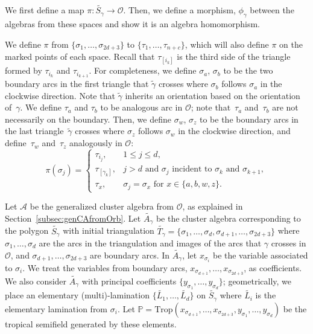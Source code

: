 \documentclass[pdftex]{sigma}%
\newcommand{\Orb}{\mathcal{O}}
\numberwithin{equation}{section}
\begin{document}
We first define a map $\pi\colon \widetilde{S_\gamma} \to \mathcal{O}$. Then, we define a morphism, $\phi_\gamma$ between the algebras from these spaces and show it is an algebra homomorphism.

We define $\pi$ from $\{\sigma_1,\ldots, \sigma_{2d +3}\}$ to $\{\tau_1,\ldots, \tau_{n+c}\}$, which will also define $\pi$ on the marked points of each space. Recall that $\tau_{[i_k]}$ is the third side of the triangle formed by $\tau_{i_k}$ and $\tau_{i_{k+1}}$. For completeness, we define $\sigma_a$, $\sigma_b$ to be the two boundary arcs in the first triangle that $\widetilde{\gamma}$ crosses where $\sigma_b$ follows $\sigma_a$ in the clockwise direction. Note that $\widetilde{\gamma}$ inherits an orientation based on the orientation of~$\gamma$. We define $\tau_a$ and $\tau_b$ to be analogous arc in $\mathcal{O}$; note that~$\tau_a$ and~$\tau_b$ are not necessarily on the boundary. Then, we define $\sigma_w$, $\sigma_z$ to be the boundary arcs in the last triangle~$\widetilde{\gamma}$ crosses where $\sigma_z$ follows $\sigma_w$ in the clockwise direction, and define~$\tau_w$ and~$\tau_z$ analogously in $\mathcal{O}$:
\[
\pi(\sigma_j) = \begin{cases} \tau_{i_j}, & 1 \leq j \leq d, \\ \tau_{[\gamma_k]}, & j > d \text{ and } \sigma_j \text{ incident to } \sigma_k \text{ and } \sigma_{k+1}, \\
\tau_{x}, & \sigma_j = \sigma_x \text{ for } x \in \{a,b,w,z\}. \end{cases}
\]

Let $\mathcal{A}$ be the generalized cluster algebra from $\Orb$, as explained in Section~\ref{subsec:genCAfromOrb}. Let $\widetilde{A_\gamma}$ be the cluster algebra corresponding to the polygon $\widetilde{S_\gamma}$ with initial triangulation $\widetilde{T_\gamma} = \{\sigma_1,\ldots, \sigma_d,\sigma_{d+1},\allowbreak \ldots, \sigma_{2d + 3}\}$ where $\sigma_1,\ldots, \sigma_d$ are the arcs in the triangulation and images of the arcs that $\gamma$ crosses in $\Orb$, and $\sigma_{d+1},\ldots, \sigma_{2d + 3}$ are boundary arcs.
In $\widetilde{A_\gamma}$, let $x_{\sigma_i}$ be the variable associated to $\sigma_i$. We treat the variables from boundary arcs, $x_{\sigma_{d+1}},\ldots, x_{\sigma_{2d+3}}$, as coefficients. We also consider $\widetilde{A_\gamma}$ with principal coefficients $\{y_{\sigma_1},\ldots, y_{\sigma_d}\}$; geometrically, we place an elementary (multi)-lamination $\big\{\widetilde{L_1},\ldots, \widetilde{L_d}\big\}$ on $\widetilde{S_\gamma}$ where $\widetilde{L_i}$ is the elementary lamination from $\sigma_i$.
 Let $\mathbb{P} = \text{Trop}(x_{\sigma_{d+1}},\ldots,x_{\sigma_{2d+3}}, y_{\sigma_1},\ldots, y_{\sigma_d})$ be the tropical semifield generated by these elements.
\end{document}
